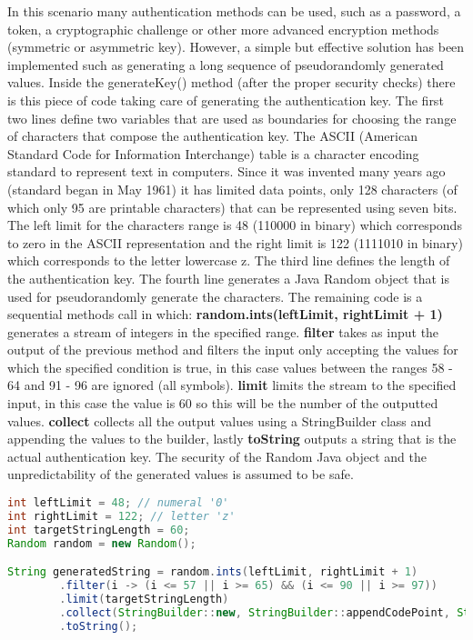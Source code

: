 \documentclass[a4paper,10pt]{memoir}
\begin{document}
In this scenario many authentication methods can be used, such as a password, a token, a cryptographic challenge or other more advanced encryption methods (symmetric or asymmetric key). However, a simple but effective solution has been implemented such as generating a long sequence of pseudorandomly generated values. Inside the generateKey() method (after the proper security checks) there is this piece of code taking care of generating the authentication key. The first two lines define two variables that are used as boundaries for choosing the range of characters that compose the authentication key. The ASCII (American Standard Code for Information Interchange) table is a character encoding standard to represent text in computers. Since it was invented many years ago (standard began in May 1961) it has limited data points, only 128 characters (of which only 95 are printable characters) that can be represented using seven bits. The left limit for the characters range is 48 (110000 in binary) which corresponds to zero in the ASCII representation and the right limit is 122 (1111010 in binary) which corresponds to the letter lowercase z. The third line defines the length of the authentication key. The fourth line generates a Java Random object that is used for pseudorandomly generate the characters. The remaining code is a sequential methods call in which: \textbf{random.ints(leftLimit, rightLimit + 1)} generates a stream of integers in the specified range. \textbf{filter} takes as input the output of the previous method and filters the input only accepting the values for which the specified condition is true, in this case values between the ranges 58 - 64 and 91 - 96 are ignored (all symbols). \textbf{limit} limits the stream to the specified input, in this case the value is 60 so this will be the number of the outputted values. \textbf{collect} collects all the output values using a StringBuilder class and appending the values to the builder, lastly \textbf{toString} outputs a string that is the actual authentication key. The security of the Random Java object and the unpredictability of the generated values is assumed to be safe.
\begin{lstlisting}[language=Java,firstnumber=82]
int leftLimit = 48; // numeral '0'
int rightLimit = 122; // letter 'z'
int targetStringLength = 60;
Random random = new Random();

String generatedString = random.ints(leftLimit, rightLimit + 1)
        .filter(i -> (i <= 57 || i >= 65) && (i <= 90 || i >= 97))
        .limit(targetStringLength)
        .collect(StringBuilder::new, StringBuilder::appendCodePoint, StringBuilder::append)
        .toString();
\end{lstlisting}
\end{document}
